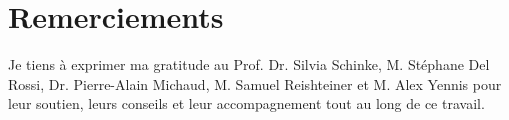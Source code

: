 \documentclass[
    iai, %
    eai, %
]{heig-tb}
\begin{document}
\maketitle
\frontmatter
\clearemptydoublepage


\clearemptydoublepage
{
  \tableofcontents
}

\printnomenclature
\clearemptydoublepage
{}
\mainmatter


\clearpage
\printbibliography

  \listoffigures
  \let\cleardoublepage\clearpage
  \listoftables
  \let\cleardoublepage\clearpage

\printnomenclature
\clearemptydoublepage
{}
\chapter*{Remerciements}

Je tiens à exprimer ma gratitude au Prof. Dr. Silvia Schinke, M. Stéphane Del Rossi, Dr. Pierre-Alain Michaud, M. Samuel Reishteiner et M. Alex Yennis pour leur soutien, leurs conseils et leur accompagnement tout au long de ce travail.
\appendix
\appendixpage
\addappheadtotoc


\let\cleardoublepage\clearpage
\backmatter

\label{glossaire}
\printnoidxglossary



\end{document}
